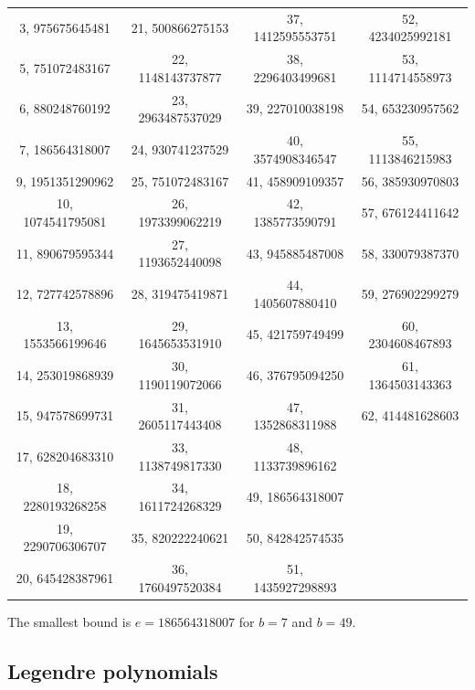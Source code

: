 \documentclass[12pt]{amsart}
\begin{document}
\begin{center}
\begin{tabular}{cccc}
3,  975675645481  & 21, 500866275153  & 37, 1412595553751 & 52, 4234025992181\\
5,  751072483167  & 22, 1148143737877 & 38, 2296403499681 & 53, 1114714558973\\
6,  880248760192  & 23, 2963487537029 & 39, 227010038198  & 54, 653230957562 \\
7,  186564318007  & 24, 930741237529  & 40, 3574908346547 & 55, 1113846215983\\
9,  1951351290962 & 25, 751072483167  & 41, 458909109357  & 56, 385930970803 \\
10, 1074541795081 & 26, 1973399062219 & 42, 1385773590791 & 57, 676124411642 \\
11, 890679595344  & 27, 1193652440098 & 43, 945885487008  & 58, 330079387370 \\
12, 727742578896  & 28, 319475419871  & 44, 1405607880410 & 59, 276902299279 \\
13, 1553566199646 & 29, 1645653531910 & 45, 421759749499  & 60, 2304608467893\\
14, 253019868939  & 30, 1190119072066 & 46, 376795094250  & 61, 1364503143363\\
15, 947578699731  & 31, 2605117443408 & 47, 1352868311988 & 62, 414481628603 \\
17, 628204683310  & 33, 1138749817330 & 48, 1133739896162 \\
18, 2280193268258 & 34, 1611724268329 & 49, 186564318007  \\
19, 2290706306707 & 35, 820222240621  & 50, 842842574535  \\
20, 645428387961  & 36, 1760497520384 & 51, 1435927298893 \\
\end{tabular}
\end{center}
The smallest bound is $e=186564318007$ for $b=7$ and $b=49$.

\subsection{Legendre polynomials}
\end{document}
